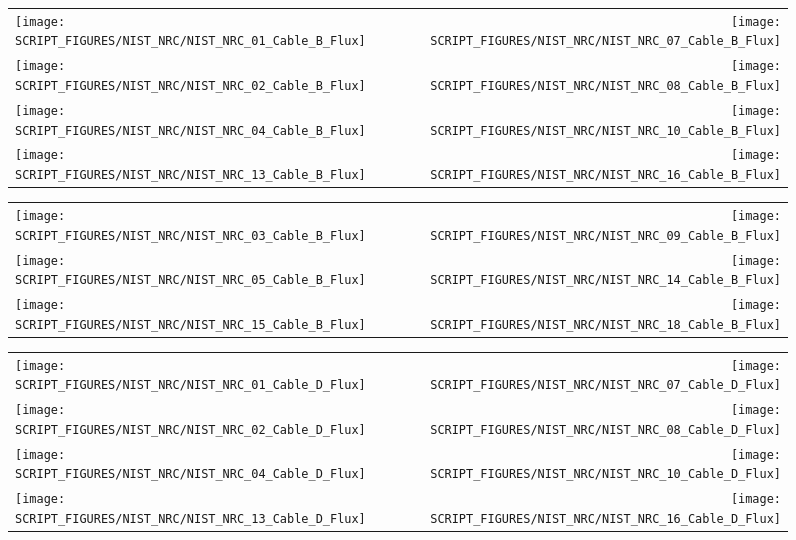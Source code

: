 \begin{figure}[!ht]
\begin{tabular*}{\textwidth}{l@{\extracolsep{\fill}}r}
\texttt{[image: SCRIPT\_FIGURES/NIST\_NRC/NIST\_NRC\_01\_Cable\_B\_Flux]} &
\texttt{[image: SCRIPT\_FIGURES/NIST\_NRC/NIST\_NRC\_07\_Cable\_B\_Flux]} \\
\texttt{[image: SCRIPT\_FIGURES/NIST\_NRC/NIST\_NRC\_02\_Cable\_B\_Flux]} &
\texttt{[image: SCRIPT\_FIGURES/NIST\_NRC/NIST\_NRC\_08\_Cable\_B\_Flux]} \\
\texttt{[image: SCRIPT\_FIGURES/NIST\_NRC/NIST\_NRC\_04\_Cable\_B\_Flux]} &
\texttt{[image: SCRIPT\_FIGURES/NIST\_NRC/NIST\_NRC\_10\_Cable\_B\_Flux]} \\
\texttt{[image: SCRIPT\_FIGURES/NIST\_NRC/NIST\_NRC\_13\_Cable\_B\_Flux]} &
\texttt{[image: SCRIPT\_FIGURES/NIST\_NRC/NIST\_NRC\_16\_Cable\_B\_Flux]}
\end{tabular*}
\label{NIST_NRC_Cable_B_Flux_Closed}
\end{figure}

\begin{figure}[!ht]
\begin{tabular*}{\textwidth}{l@{\extracolsep{\fill}}r}
\texttt{[image: SCRIPT\_FIGURES/NIST\_NRC/NIST\_NRC\_03\_Cable\_B\_Flux]} &
\texttt{[image: SCRIPT\_FIGURES/NIST\_NRC/NIST\_NRC\_09\_Cable\_B\_Flux]} \\
\texttt{[image: SCRIPT\_FIGURES/NIST\_NRC/NIST\_NRC\_05\_Cable\_B\_Flux]} &
\texttt{[image: SCRIPT\_FIGURES/NIST\_NRC/NIST\_NRC\_14\_Cable\_B\_Flux]} \\
\texttt{[image: SCRIPT\_FIGURES/NIST\_NRC/NIST\_NRC\_15\_Cable\_B\_Flux]} &
\texttt{[image: SCRIPT\_FIGURES/NIST\_NRC/NIST\_NRC\_18\_Cable\_B\_Flux]}
\end{tabular*}
\label{NIST_NRC_Cable_B_Flux_Open}
\end{figure}

\begin{figure}[!ht]
\begin{tabular*}{\textwidth}{l@{\extracolsep{\fill}}r}
\texttt{[image: SCRIPT\_FIGURES/NIST\_NRC/NIST\_NRC\_01\_Cable\_D\_Flux]} &
\texttt{[image: SCRIPT\_FIGURES/NIST\_NRC/NIST\_NRC\_07\_Cable\_D\_Flux]} \\
\texttt{[image: SCRIPT\_FIGURES/NIST\_NRC/NIST\_NRC\_02\_Cable\_D\_Flux]} &
\texttt{[image: SCRIPT\_FIGURES/NIST\_NRC/NIST\_NRC\_08\_Cable\_D\_Flux]} \\
\texttt{[image: SCRIPT\_FIGURES/NIST\_NRC/NIST\_NRC\_04\_Cable\_D\_Flux]} &
\texttt{[image: SCRIPT\_FIGURES/NIST\_NRC/NIST\_NRC\_10\_Cable\_D\_Flux]} \\
\texttt{[image: SCRIPT\_FIGURES/NIST\_NRC/NIST\_NRC\_13\_Cable\_D\_Flux]} &
\texttt{[image: SCRIPT\_FIGURES/NIST\_NRC/NIST\_NRC\_16\_Cable\_D\_Flux]}
\end{tabular*}
\label{NIST_NRC_Cable_D_Flux_Closed}
\end{figure}


